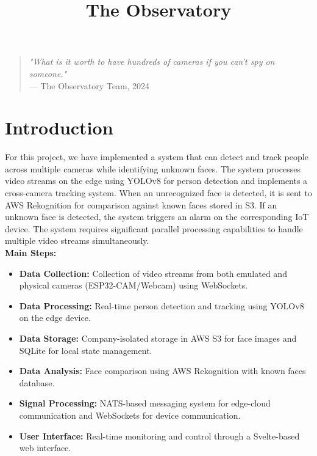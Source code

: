 \documentclass[conference]{IEEEtran}
\begin{document}
\title{The Observatory}

\author{
      \and
      \and
}

\maketitle

\begin{quote}
      \textit{"What is it worth to have hundreds of cameras if you can't spy on someone."}\\
      --- The Observatory Team, 2024
\end{quote}

\section{Introduction}
For this project, we have implemented a system that can detect and track people across multiple cameras while identifying unknown faces.
The system processes video streams on the edge using YOLOv8 for person detection and implements a cross-camera tracking system.
When an unrecognized face is detected, it is sent to AWS Rekognition for comparison against known faces stored in S3.
If an unknown face is detected, the system triggers an alarm on the corresponding IoT device.
The system requires significant parallel processing capabilities to handle multiple video streams simultaneously.
\\
\textbf{Main Steps:}
\begin{itemize}
      \item \textbf{Data Collection:} Collection of video streams from both emulated and physical cameras (ESP32-CAM/Webcam) using WebSockets.
      \item \textbf{Data Processing:} Real-time person detection and tracking using YOLOv8 on the edge device.
      \item \textbf{Data Storage:} Company-isolated storage in AWS S3 for face images and SQLite for local state management.
      \item \textbf{Data Analysis:} Face comparison using AWS Rekognition with known faces database.
      \item \textbf{Signal Processing:} NATS-based messaging system for edge-cloud communication and WebSockets for device communication.
      \item \textbf{User Interface:} Real-time monitoring and control through a Svelte-based web interface.
\end{itemize}
\end{document}
